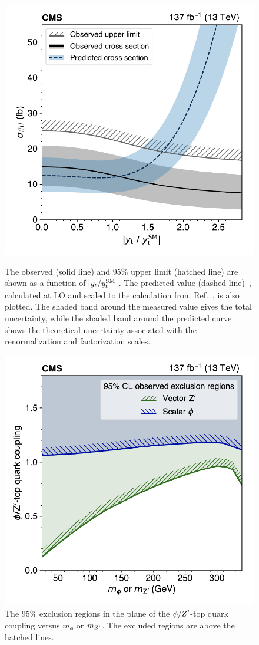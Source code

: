 \begin{figure}[!hbtp]
\centering
\includegraphics[width=.70\textwidth]{figs/ftp/yukawa.pdf}
\\
\caption{
    The observed \xsectttt (solid line) and 95\% \CL upper limit (hatched line) are shown as a function
    of $\abs{y_{t}/y_{t}^{\mathrm{SM}}}$. The predicted value (dashed line)~\cite{THEORY:TopYukawaTTTT},
    calculated at LO and scaled to the calculation from Ref.~\cite{THEORY:Frederix2017wme}, is also plotted.
    The shaded band around the measured value gives the total uncertainty, while the shaded band around
    the predicted curve shows the theoretical uncertainty associated with the renormalization and
    factorization scales.
}
\label{fig:yukawa}
\end{figure}

\begin{figure}[!hbtp]
\centering
    \includegraphics[width=.70\textwidth]{figs/ftp/plot_2d_phizprime.pdf}
\caption{
    The 95\% \CL exclusion regions in the plane of the $\phi/Z^\prime$-top quark coupling versus
    $m_{\phi}$ or $m_{Z^\prime}$. The excluded regions are above the hatched lines.
    }
\label{fig:ZprimePhiExclusions}
\end{figure}

